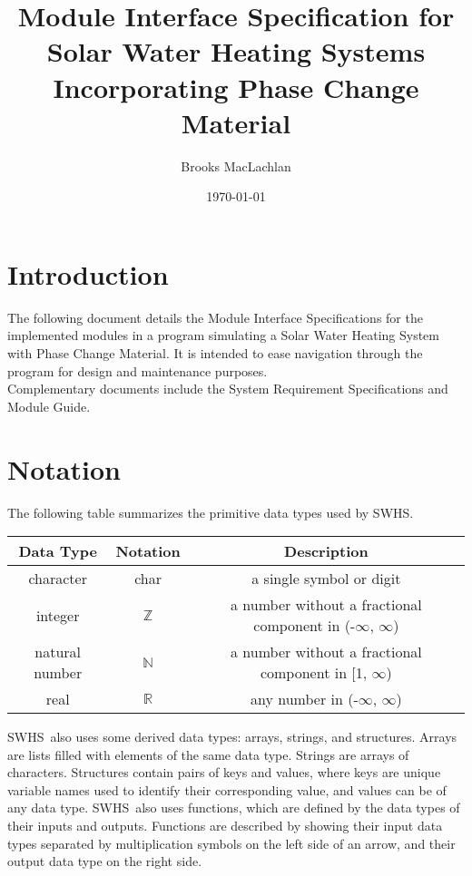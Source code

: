 \documentclass[12pt]{article}
\newcommand{\progname}{SWHS}
\begin{document}
\title{Module Interface Specification for Solar Water Heating Systems Incorporating Phase Change Material}
\author{Brooks MacLachlan}
\date{\today}

\maketitle

\tableofcontents

\section{Introduction}

The following document details the Module Interface Specifications for the implemented 
modules in a program simulating a Solar Water Heating System with Phase Change Material.
It is intended to ease navigation through the program for design and maintenance purposes.\\
Complementary documents include the System Requirement Specifications and Module Guide. 

\section{Notation}

The following table summarizes the primitive data types used by \progname. 

\begin{center}
\renewcommand{\arraystretch}{1.2}
\noindent 
\begin{tabular}{c c c} 
\toprule 
\textbf{Data Type} & \textbf{Notation} & \textbf{Description}\\ 
\midrule
character & char & a single symbol or digit\\
integer & $\mathbb{Z}$ & a number without a fractional component in (-$\infty$, $\infty$) \\
natural number & $\mathbb{N}$ & a number without a fractional component in [1, $\infty$) \\
real & $\mathbb{R}$ & any number in (-$\infty$, $\infty$)\\
\bottomrule
\end{tabular} 
\end{center}

\noindent
\progname \ also uses some derived data types: arrays, strings, and structures. Arrays are lists filled with elements of the same data type. Strings are arrays of characters. Structures contain pairs of keys and values, where keys are unique variable names used to identify their corresponding value, and values can be of any data type. \progname \ also uses functions, which are defined by the data types of their inputs and outputs. Functions are described by showing their input data types separated by multiplication symbols on the left side of an arrow, and their output data type on the right side.
\end{document}
